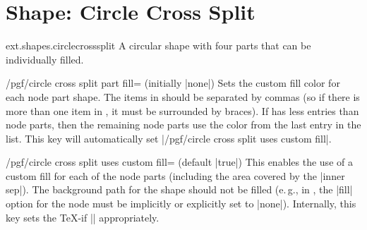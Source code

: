 %
%
%
\section{Shape: Circle Cross Split}
\begin{pgflibrary}{ext.shapes.circlecrosssplit}
  A circular shape with four parts that can be individually filled.
\end{pgflibrary}
\begin{key}{/pgf/circle cross split part fill= (initially |none|)}
Sets the custom fill color for each node part shape.
The items in  should be separated by commas
(so if there is more than one item in , it must be surrounded by braces).
If  has less entries than node parts,
then the remaining node parts use the color from the last entry in the list.
This key will automatically set |/pgf/circle cross split uses custom fill|.
\end{key}
\begin{key}{/pgf/circle cross split uses custom fill= (default |true|)}
This enables the use of a custom fill for each of the node parts
(including the area covered by the |inner sep|).
The background path for the shape should not be filled (e.\,g., in \tikzname,
the |fill| option for the node must be implicitly or explicitly set to |none|).
Internally, this key sets the \TeX-if |\ifpgfcirclecrosssplitcustomfill| appropriately. 
\end{key}
\begin{codeexample}[preamble=\usepgflibrary{ext.shapes.circlecrosssplit}]
\end{codeexample}
